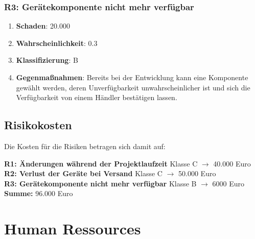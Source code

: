 \subsubsection{R3: Gerätekomponente nicht mehr verfügbar}
\begin{enumerate}
	\item \textbf{Schaden}: 20.000
	\item \textbf{Wahrscheinlichkeit}: 0.3
	\item \textbf{Klassifizierung}: B
	\item \textbf{Gegenmaßnahmen}: Bereits bei der Entwicklung kann eine Komponente gewählt werden, deren Unverfügbarkeit unwahrscheinlicher ist und sich die Verfügbarkeit von einem Händler bestätigen lassen.
\end{enumerate}

\subsection{Risikokosten}

Die Kosten für die Risiken betragen sich damit auf:

\textbf{R1: Änderungen während der Projektlaufzeit} Klasse C  $\rightarrow$ 40.000 Euro\\
\textbf{R2: Verlust der Geräte bei Versand} Klasse C  $\rightarrow$ 50.000 Euro\\
\textbf{R3: Gerätekomponente nicht mehr verfügbar} Klasse B  $\rightarrow$ 6000 Euro\\
\textbf{Summe:} 96.000 Euro



\section{Human Ressources}
